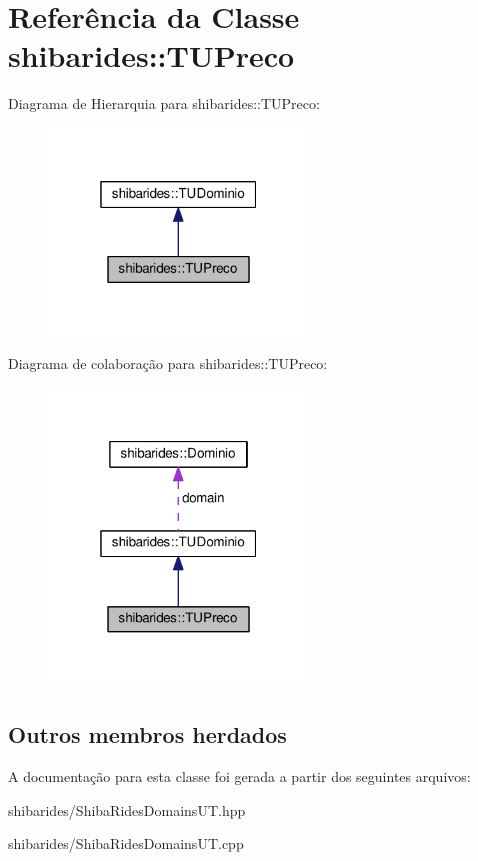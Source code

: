 \hypertarget{classshibarides_1_1TUPreco}{}\section{Referência da Classe shibarides\+:\+:T\+U\+Preco}
\label{classshibarides_1_1TUPreco}


Diagrama de Hierarquia para shibarides\+:\+:T\+U\+Preco\+:\nopagebreak
\begin{figure}[H]
\begin{center}
\leavevmode
\includegraphics[width=196pt]{classshibarides_1_1TUPreco__inherit__graph}
\end{center}
\end{figure}


Diagrama de colaboração para shibarides\+:\+:T\+U\+Preco\+:\nopagebreak
\begin{figure}[H]
\begin{center}
\leavevmode
\includegraphics[width=196pt]{classshibarides_1_1TUPreco__coll__graph}
\end{center}
\end{figure}
\subsection*{Outros membros herdados}


A documentação para esta classe foi gerada a partir dos seguintes arquivos\+:\begin{DoxyCompactItemize}
\item 
shibarides/Shiba\+Rides\+Domains\+U\+T.\+hpp\item 
shibarides/Shiba\+Rides\+Domains\+U\+T.\+cpp\end{DoxyCompactItemize}
